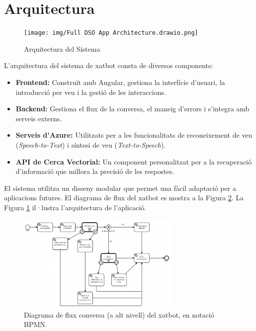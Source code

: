 \documentclass[a4paper,12pt,oneside]{ThesisStyle}
\begin{document}
\section{Arquitectura}
\label{sec:architecture}

\begin{figure}[h]
  \centering
  \texttt{[image: img/Full DSO App Architecture.drawio.png]}
  \caption{Arquitectura del Sistema}
  \label{fig:architecture}
\end{figure}

L'arquitectura del sistema de xatbot consta de diversos components:

\begin{itemize}
    \item \textbf{Frontend:} Construït amb Angular, gestiona la interfície d'usuari, la introducció per veu i la gestió de les interaccions.
    \item \textbf{Backend:} Gestiona el flux de la conversa, el maneig d'errors i s'integra amb serveis externs.
    \item \textbf{Serveis d'Azure:} Utilitzats per a les funcionalitats de reconeixement de veu (\textit{Speech-to-Text}) i síntesi de veu (\textit{Text-to-Speech}).
    \item \textbf{API de Cerca Vectorial:} Un component personalitzat per a la recuperació d'informació que millora la precisió de les respostes.
\end{itemize}

El sistema utilitza un disseny modular que permet una fàcil adaptació per a aplicacions futures. El diagrama de flux del xatbot es mostra a la Figura \ref{fig:coversation_process}. La Figura \ref{fig:architecture} il·lustra l'arquitectura de l'aplicació.

\begin{figure}[h]
    \centering
    \includegraphics[width=0.7\textwidth]{img/Conversation_process.bpmn20.png}
    \caption{Diagrama de flux conversa (a alt nivell) del xatbot, en notació BPMN.}
    \label{fig:coversation_process}
\end{figure}
\end{document}
